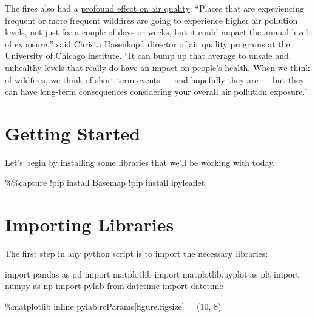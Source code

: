 \documentclass[
  letterpaper,
  DIV=11,
  numbers=noendperiod]{scrreprt}
\newenvironment{Shaded}{\begin{snugshade}}{\end{snugshade}}
\newcommand{\DecValTok}[1]{\textcolor[rgb]{0.68,0.00,0.00}{#1}}
\newcommand{\ImportTok}[1]{\textcolor[rgb]{0.00,0.46,0.62}{#1}}
\newcommand{\NormalTok}[1]{\textcolor[rgb]{0.00,0.23,0.31}{#1}}
\newcommand{\OperatorTok}[1]{\textcolor[rgb]{0.37,0.37,0.37}{#1}}
\newcommand{\StringTok}[1]{\textcolor[rgb]{0.13,0.47,0.30}{#1}}
\begin{document}
The fires also had a
\href{https://epic.uchicago.edu/news/pollution-from-californias-2020-wildfires-likely-offset-decades-of-air-quality-gains/}{profound
effect on air quality}: ``Places that are experiencing frequent or more
frequent wildfires are going to experience higher air pollution levels,
not just for a couple of days or weeks, but it could impact the annual
level of exposure,'' said Christa Hasenkopf, director of air quality
programs at the University of Chicago institute. ``It can bump up that
average to unsafe and unhealthy levels that really do have an impact on
people's health. When we think of wildfires, we think of short-term
events --- and hopefully they are --- but they can have long-term
consequences considering your overall air pollution exposure.''

\hypertarget{getting-started}{%
\section{Getting Started}\label{getting-started}}

Let's begin by installing some libraries that we'll be working with
today.

\begin{Shaded}
\begin{Highlighting}[]
\OperatorTok{\%\%}\NormalTok{capture}
\OperatorTok{!}\NormalTok{pip install Basemap}
\OperatorTok{!}\NormalTok{pip install ipyleaflet}
\end{Highlighting}
\end{Shaded}

\hypertarget{importing-libraries}{%
\section{Importing Libraries}\label{importing-libraries}}

The first step in any python script is to import the necessary
libraries:

\begin{Shaded}
\begin{Highlighting}[]
\ImportTok{import}\NormalTok{ pandas }\ImportTok{as}\NormalTok{ pd}
\ImportTok{import}\NormalTok{ matplotlib}
\ImportTok{import}\NormalTok{ matplotlib.pyplot }\ImportTok{as}\NormalTok{ plt}
\ImportTok{import}\NormalTok{ numpy }\ImportTok{as}\NormalTok{ np}
\ImportTok{import}\NormalTok{ pylab}
\ImportTok{from}\NormalTok{ datetime }\ImportTok{import}\NormalTok{ datetime}

\OperatorTok{\%}\NormalTok{matplotlib inline}
\NormalTok{pylab.rcParams[}\StringTok{\textquotesingle{}figure.figsize\textquotesingle{}}\NormalTok{] }\OperatorTok{=}\NormalTok{ (}\DecValTok{10}\NormalTok{, }\DecValTok{8}\NormalTok{)}
\end{Highlighting}
\end{Shaded}
\end{document}
